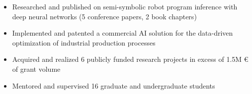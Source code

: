 \medskip

\begin{itemize}
  \item Researched and published on semi-symbolic robot program inference with deep neural networks (5 conference papers, 2 book chapters)
  \item Implemented and patented a commercial AI solution for the data-driven optimization of industrial production processes
  \item Acquired and realized 6 publicly funded research projects in excess of 1.5M € of grant volume
  \item Mentored and supervised 16 graduate and undergraduate students
\end{itemize}







